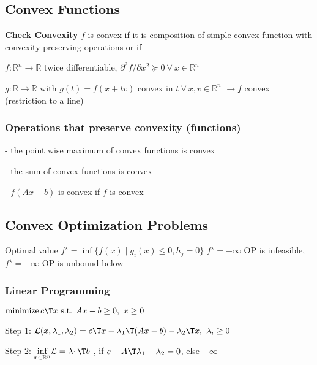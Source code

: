 \subsection{Convex Functions}


\textbf{Check Convexity} $f$ is convex if it is
composition of simple convex function
with convexity preserving operations
or if


$f: \mathbb{R}^n \rightarrow \mathbb{R}$ twice differentiable,
$\partial^2f/\partial x^2 \succeq 0\ \forall\ x \in \mathbb{R}^{n}$

$g: \mathbb{R} \rightarrow \mathbb{R}$ with $g(t)=f(x+tv)$
convex in $t\ \forall\ x,v \in \mathbb{R}^{n}$
$\rightarrow f$ convex (restriction to a line)



\subsubsection{Operations that preserve convexity (functions)}

- the point wise maximum of convex functions is convex

- the sum of convex functions is convex

- $f(Ax+b)$ is convex if $f$ is convex

\subsection{Convex Optimization Problems}


Optimal value $f^\star =
	\operatorname{inf}\{f(x)\mid
	g_i(x)\le0,h_j=0 \}$
$f^\star=+\infty$ OP is infeasible,
$f^\star=-\infty$ OP is unbound below



\subsubsection{Linear Programming}
$ \operatorname{minimize} c\T x
	\text{ s.t. } Ax-b \ge 0,\ x\ge0$

Step 1:
$\mathcal{L}(x,\lambda_1,\lambda_2) =
	c\T x-\lambda_1\T (Ax-b) -\lambda_2\T x,\ \lambda_i \ge0$

Step 2:
$\underset{x \in \mathcal{\mathbb{R}}^n}{\operatorname{inf}}
	\mathcal{L}=\lambda_1\T b$
, if $c-A\T\lambda_1-\lambda_2=0$, else $-\infty$

